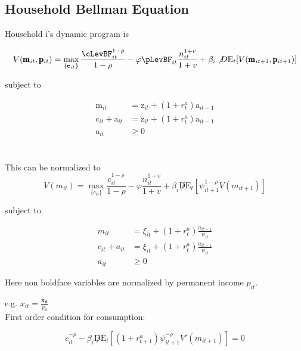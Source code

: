 \documentclass[titlepage]{\econtex}\providecommand{\texname}{FBS-NK}
\begin{document}
\hypertarget{Household Bellman Equation }{}
\subsection{Household Bellman Equation}

Household i's dynamic program is

$$ V(\pmb{\mathrm{m}}_{it},\pmb{\mathrm{p}}_{it})=\max_{ \{ \pmb{\mathrm{c}}_{it}\}} { \frac{\cLevBF_{i t}^{1-\rho}}{1 -\rho} - \varphi \pLevBF_{it} \frac{n_{it}^{1+v}}{1+v} + \beta_{i} \not D \mathrm{E}_{t}[V( \pmb{\mathrm{m}}_{it+1} , \pmb{\mathrm{p}}_{it+1})]}$$

subject to 

\begin{align*}
 \pmb{\mathrm{m}}_{i t} & = \pmb{\mathrm{z}}_{i t}  + (1+\mathit{r}^{a}_{t})\pmb{\mathrm{a}}_{i t-1} \\
 \pmb{\mathrm{c}}_{i t}  + \pmb{\mathrm{a}}_{i t} &= \pmb{\mathrm{z}}_{i t}  + (1+\mathit{r}^{a}_{t}) \pmb{\mathrm{a}}_{i t-1}   \\
\pmb{\mathrm{a}}_{it} &\geq 0 
\end{align*} \\ \\

This can be normalized to \\


$$ V(m_{it}) = \max_{\{c_{it}\}} {  \frac{c_{i t}^{1-\rho}}{1 -\rho} - \varphi \frac{n_{it}^{1+v}}{1+v} + \beta_{i}\not D \mathrm{E}_{t}[\psi_{it+1}^{1-\rho} V(m_{it+1})]}$$

 subject to 
 
 \begin{align*}
m_{i t} &=  \xi_{it}  + (1+r^{a}_{t}) \frac{a_{i t-1}}{\psi_{it}} \\
 c_{i t}  + a_{i t} &= \xi_{it}  + (1+r^{a}_{t}) \frac{a_{i t-1}}{\psi_{it}} \\
 a_{it} &\geq 0 
 \end{align*}
 
 Here non boldface variables are normalized by permanent income $\mathit{p_{it}}$. 

e.g. $x_{it} = \frac{\mathbf{x_{it}}}{\pmb{\mathrm{p}}_{it}}$ \\

First order condition for consumption:

$$c_{it}^{-\rho} -  \beta_{i} \not D \mathrm{E}_{t}\left[ (1+r^{a}_{t+1})  \psi_{it+1}^{-\rho} V'(m_{it+1})\right] = 0$$ \\ 
\end{document}
